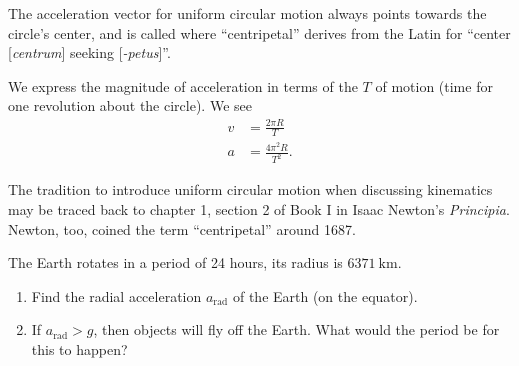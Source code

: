 The acceleration vector for uniform circular motion always points
towards the circle's center, and is called 
where ``centripetal'' derives from the Latin for ``center
[\emph{centrum}] seeking [\emph{-petus}]''.

We express the magnitude of acceleration in terms of the
$T$ of motion (time for one revolution about the circle). We see
\begin{subequations}
\begin{align}
v &= \frac{2\pi R}{T}\\
a &=\frac{4\pi^{2}R}{T^{2}}.
\end{align}
\end{subequations}

\begin{remark}
The tradition to introduce uniform circular motion when discussing
kinematics may be traced back to chapter 1, section 2 of
Book I in Isaac Newton's \emph{Principia}. Newton, too, coined the term
``centripetal'' around 1687.
\end{remark}

\workedExamples{}

The Earth rotates in a period of 24 hours, its radius is
$\SI{6371}{\kilo\meter}$.
\begin{enumerate}
\item Find the radial acceleration $a_{\text{rad}}$ of the Earth (on the
  equator).
\item If $a_{\text{rad}}>g$, then objects will fly off the Earth. What
  would the period be for this to happen?
\end{enumerate}

